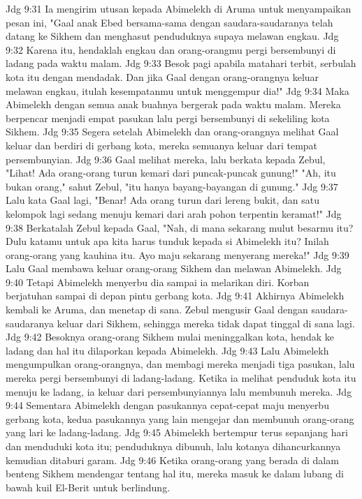 Jdg 9:31  Ia mengirim utusan kepada Abimelekh di Aruma untuk menyampaikan pesan ini, "Gaal anak Ebed bersama-sama dengan saudara-saudaranya telah datang ke Sikhem dan menghasut penduduknya supaya melawan engkau.
Jdg 9:32  Karena itu, hendaklah engkau dan orang-orangmu pergi bersembunyi di ladang pada waktu malam.
Jdg 9:33  Besok pagi apabila matahari terbit, serbulah kota itu dengan mendadak. Dan jika Gaal dengan orang-orangnya keluar melawan engkau, itulah kesempatanmu untuk menggempur dia!"
Jdg 9:34  Maka Abimelekh dengan semua anak buahnya bergerak pada waktu malam. Mereka berpencar menjadi empat pasukan lalu pergi bersembunyi di sekeliling kota Sikhem.
Jdg 9:35  Segera setelah Abimelekh dan orang-orangnya melihat Gaal keluar dan berdiri di gerbang kota, mereka semuanya keluar dari tempat persembunyian.
Jdg 9:36  Gaal melihat mereka, lalu berkata kepada Zebul, "Lihat! Ada orang-orang turun kemari dari puncak-puncak gunung!" "Ah, itu bukan orang," sahut Zebul, "itu hanya bayang-bayangan di gunung."
Jdg 9:37  Lalu kata Gaal lagi, "Benar! Ada orang turun dari lereng bukit, dan satu kelompok lagi sedang menuju kemari dari arah pohon terpentin keramat!"
Jdg 9:38  Berkatalah Zebul kepada Gaal, "Nah, di mana sekarang mulut besarmu itu? Dulu katamu untuk apa kita harus tunduk kepada si Abimelekh itu? Inilah orang-orang yang kauhina itu. Ayo maju sekarang menyerang mereka!"
Jdg 9:39  Lalu Gaal membawa keluar orang-orang Sikhem dan melawan Abimelekh.
Jdg 9:40  Tetapi Abimelekh menyerbu dia sampai ia melarikan diri. Korban berjatuhan sampai di depan pintu gerbang kota.
Jdg 9:41  Akhirnya Abimelekh kembali ke Aruma, dan menetap di sana. Zebul mengusir Gaal dengan saudara-saudaranya keluar dari Sikhem, sehingga mereka tidak dapat tinggal di sana lagi.
Jdg 9:42  Besoknya orang-orang Sikhem mulai meninggalkan kota, hendak ke ladang dan hal itu dilaporkan kepada Abimelekh.
Jdg 9:43  Lalu Abimelekh mengumpulkan orang-orangnya, dan membagi mereka menjadi tiga pasukan, lalu mereka pergi bersembunyi di ladang-ladang. Ketika ia melihat penduduk kota itu menuju ke ladang, ia keluar dari persembunyiannya lalu membunuh mereka.
Jdg 9:44  Sementara Abimelekh dengan pasukannya cepat-cepat maju menyerbu gerbang kota, kedua pasukannya yang lain mengejar dan membunuh orang-orang yang lari ke ladang-ladang.
Jdg 9:45  Abimelekh bertempur terus sepanjang hari dan menduduki kota itu; penduduknya dibunuh, lalu kotanya dihancurkannya kemudian ditaburi garam.
Jdg 9:46  Ketika orang-orang yang berada di dalam benteng Sikhem mendengar tentang hal itu, mereka masuk ke dalam lubang di bawah kuil El-Berit untuk berlindung.
